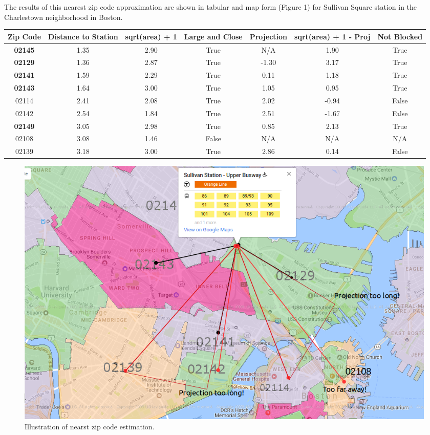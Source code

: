 \documentclass{article}
\begin{document}
The results of this nearest zip code approximation are shown in tabular and map form (Figure 1) for Sullivan Square station in the Charlestown neighborhood in Boston.

\begin{center}
\begin{tabular}{ c c c c c c c }
\hline
Zip Code & Distance to Station & sqrt(area) + 1& Large and Close & Projection & sqrt(area) + 1 - Proj & Not Blocked \\
\hline
\bf{02145} & 1.35 & 2.90 & True & N/A & 1.90 & True \\
\bf{02129} & 1.36 & 2.87 & True & -1.30 & 3.17 & True \\
\bf{02141} & 1.59 & 2.29 & True & 0.11 & 1.18 & True \\
\bf{02143} & 1.64 & 3.00 & True & 1.05 & 0.95 & True \\
02114 & 2.41 & 2.08 & True & 2.02 & -0.94 & False \\
02142 & 2.54 & 1.84 & True & 2.51 & -1.67 & False \\
\bf{02149} & 3.05 & 2.98 & True & 0.85 & 2.13 & True \\
02108 & 3.08 & 1.46 & False & N/A & N/A & N/A \\ 
02139 & 3.18 & 3.00 & True & 2.86 & 0.14 & False \\
\hline
\end{tabular}
\end{center}

\begin{figure}[H]\label{fig:f1}
\begin{center}\includegraphics[scale=0.6]{Sullivan_for_distance_with_markup}\end{center}\caption{Illustration of nearst zip code estimation.}
\end{figure}
\end{document}
